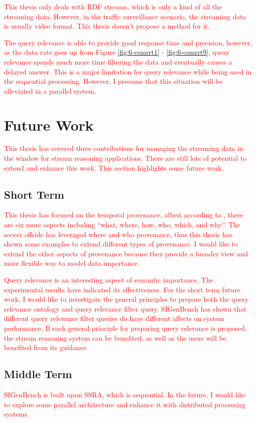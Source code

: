\textcolor{red}{
This thesis only deals with RDF streams, which is only a kind of all the streaming data.
However, in the traffic surveillance scenario, the streaming data is usually video format. 
This thesis doesn't propose a method for it. 
}

\textcolor{red}{
The query relevance is able to provide good response time and precision, however, as the data rate goes up from Figure \ref{fig:6-csmrrt1} - \ref{fig:6-csmrrt9}, query relevance spends much more time filtering the data and eventually causes a delayed answer. 
This is a major limitation for query relevance while being used in the sequential processing. 
However, I presume that this situation will be alleviated in a parallel system. 
}
%
\section{Future Work}
\textcolor{red}{
This thesis has covered three contributions for managing the streaming data in the window for stream reasoning applications.
There are still lots of potential to extend and enhance this work. 
This section highlights some future work.
}
%
\subsection{Short Term}
\textcolor{red}{
This thesis has focused on the temporal provenance, albeit according to \cite{ram2009new}, there are six more aspects including ``what, where, how, who, which, and why''.
The soccer offside has leveraged where and who provenance, thus this thesis has shown some examples to extend different types of provenance.
I would like to extend the other aspects of provenance because they provide a broader view and more flexible way to model data importance.
}

\textcolor{red}{
Query relevance is an interesting aspect of semantic importance.
The experimental results have indicated its effectiveness. 
For the short term future work, I would like to investigate the general principles to prepare both the query relevance ontology and query relevance filter query. 
SIGenBench has shown that different query relevance filter queries do have different affects on system performance. 
If such general principle for preparing query relevance is proposed, the stream reasoning system can be benefited, as well as the users will be benefited from its guidance. 
}
%
\subsection{Middle Term}
\textcolor{red}{
SIGenBench is built upon SSRA, which is sequential.
In the future, I would like to explore some parallel architecture and enhance it with distributed processing systems.
}

